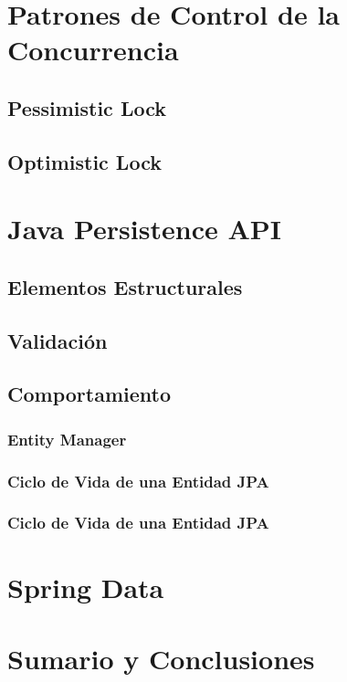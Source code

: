 \documentclass[a4paper,slidestop,xcolor=pst,blue]{beamer}
\begin{document}
\section{Patrones de Control de la Concurrencia}

\subsection{Pessimistic Lock}

\subsection{Optimistic Lock}

\section{Java Persistence API}

\subsection{Elementos Estructurales}

\subsection{Validación}

\subsection{Comportamiento}

\begin{frame}[c]
    \frametitle{Entity Manager}
\end{frame}

\begin{frame}[c]
    \frametitle{Ciclo de Vida de una Entidad JPA}
\end{frame}




\begin{frame}[c]
    \frametitle{Ciclo de Vida de una Entidad JPA}
\end{frame}

\section{Spring Data}

\section{Sumario y Conclusiones}
\end{document}

